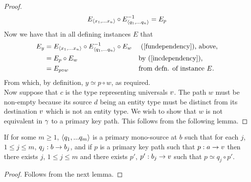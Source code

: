 \begin{proof}
\begin{equation}
\label{incdependency}
E_{\langle x_1,...x_n\rangle} \circ E^{-1}_{\langle q_1,...q_n\rangle} = E_p
\end{equation}
Now we have  that in all defining instances $E$ that 
\begin{align*}
E_y &= E_{\langle x_1,...x_n\rangle} \circ E_{\langle q_1,...q_n\rangle}^{-1} \circ E_w  && \text{ (\ref{fundependency}), above,}\\
    &= E_p \circ E_w                                   && \text{by (\ref{incdependency}),}\\
		&= E_{p \circ w}                                   && \text{from defn. of instance }E.\\
\end{align*} 
\vspace{-0.3cm}
From which, by definition, $y\simeq p \circ w$, as required. \\

Now suppose that $c$ is the type representing universals $v$. The path $w$ must be non-empty because its source $d$ being 
an entity type must be distinct from its destination $v$ which is not an entity type. 
We wish to show that $w$ is not equivalent in $\gamma$ to
a primary key path. This follows from the following lemma.
\end{proof}




\begin{lemma}
If for some $m \geq 1$, $\langle q_1,...q_m\rangle$ is a primary mono-source at $b$ such that for each $j$, $1 \leq j \leq m$, $q_j : b \rightarrow b_j$,
and if  $p$ is a primary key path such that $p: a \rightarrow v$   
then there exists $j$, $1 \leq j \leq m$ and there exists $p'$, $p': b_j \rightarrow v$ such that $p \simeq q_j \circ p'$.
\end{lemma}
\begin{proof}
Follows from the next lemma.
\end{proof}


